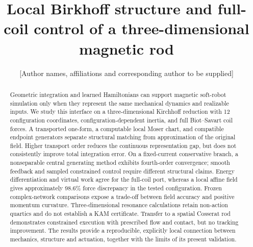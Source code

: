 \documentclass[Afour,sageh,times]{sagej}
\title{Local Birkhoff structure and full-coil control of a three-dimensional magnetic rod}
\author{[Author names, affiliations and corresponding author to be supplied]}
\begin{document}
\begin{abstract}
Geometric integration and learned Hamiltonians can support magnetic soft-robot simulation only when they represent the same mechanical dynamics and realizable inputs. We study this interface on a three-dimensional Kirchhoff reduction with 12 configuration coordinates, configuration-dependent inertia, and full Biot--Savart coil forces. A transported one-form, a computable local Moser chart, and compatible endpoint generators separate structural matching from approximation of the original field. Higher transport order reduces the continuous representation gap, but does not consistently improve total integration error. On a fixed-current conservative branch, a nonseparable central generating method exhibits fourth-order convergence; smooth feedback and sampled constrained control require different structural claims. Energy differentiation and virtual work agree for the full-coil port, whereas a local affine field gives approximately 98.6\% force discrepancy in the tested configuration. Frozen complex-network comparisons expose a trade-off between field accuracy and positive momentum curvature. Three-dimensional resonance calculations retain non-action quartics and do not establish a KAM certificate. Transfer to a spatial Cosserat rod demonstrates constrained execution with prescribed flow and contact, but no tracking improvement. The results provide a reproducible, explicitly local connection between mechanics, structure and actuation, together with the limits of its present validation.
\end{abstract}
\maketitle









\end{document}

